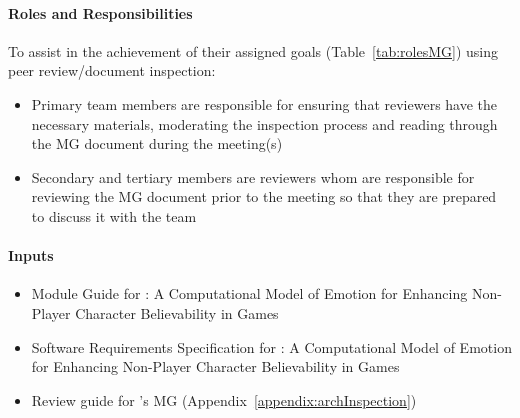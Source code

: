 \paragraph{Roles and Responsibilities} To assist in the achievement of their
assigned goals (Table~\ref{tab:rolesMG}) using peer review/document inspection:
\begin{itemize}

    \item Primary team members are responsible for ensuring that reviewers have
    the necessary materials, moderating the inspection process and reading
    through the MG document during the meeting(s)

    \item Secondary and tertiary members are reviewers whom are responsible for
    reviewing the MG document prior to the meeting so that they are prepared to
    discuss it with the team

\end{itemize}

\paragraph{Inputs}
\begin{itemize}

    \item Module Guide for \progname{}: A Computational Model of Emotion for
    Enhancing Non-Player Character Believability in Games

    \item Software Requirements Specification for \progname{}: A Computational
    Model of Emotion for Enhancing Non-Player Character Believability in Games

    \item Review guide for \progname{}'s MG
    (Appendix~\ref{appendix:archInspection})

\end{itemize}

